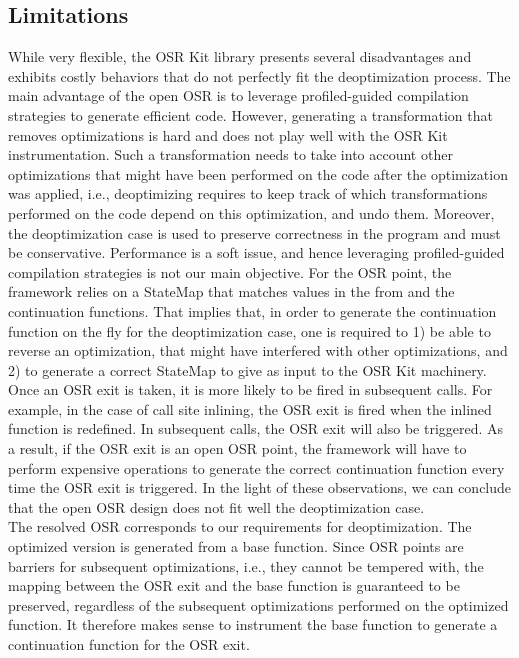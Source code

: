 \subsection{Limitations}
While very flexible, the OSR Kit\cite{OSRKit} library presents several disadvantages and exhibits costly behaviors that do not perfectly fit the deoptimization process.
The main advantage of the open OSR is to leverage profiled-guided compilation strategies to generate efficient code.
However, generating a transformation that removes optimizations is hard and does not play well with the OSR Kit instrumentation.
Such a transformation needs to take into account other optimizations that might have been performed on the code after the optimization was applied, i.e., deoptimizing requires to keep track of which transformations performed on the code depend on this optimization, and undo them.
Moreover, the deoptimization case is used to preserve correctness in the program and must be conservative. 
Performance is a soft issue, and hence leveraging profiled-guided compilation strategies is not our main objective. 
For the OSR point, the framework relies on a StateMap that matches values in the from and the continuation functions.
That implies that, in order to generate the continuation function on the fly for the deoptimization case, one is required to 1) be able to reverse an optimization, that might have interfered with other optimizations, and 2) to generate a correct StateMap to give as input to the OSR Kit machinery.\\

Once an OSR exit is taken, it is more likely to be fired in subsequent calls.
For example, in the case of call site inlining, the OSR exit is fired when the inlined function is redefined.
In subsequent calls, the OSR exit will also be triggered.
As a result, if the OSR exit is an open OSR point, the framework will have to perform expensive operations to generate the correct continuation function every time the OSR exit is triggered.
In the light of these observations, we can conclude that the open OSR design does not fit well the deoptimization case.\\

The resolved OSR corresponds to our requirements for deoptimization.
The optimized version is generated from a base function.
Since OSR points are barriers for subsequent optimizations, i.e., they cannot be tempered with, the mapping between the OSR exit and the base function is guaranteed to be preserved, regardless of the subsequent optimizations performed on the optimized function.
It therefore makes sense to instrument the base function to generate a continuation function for the OSR exit.\\

